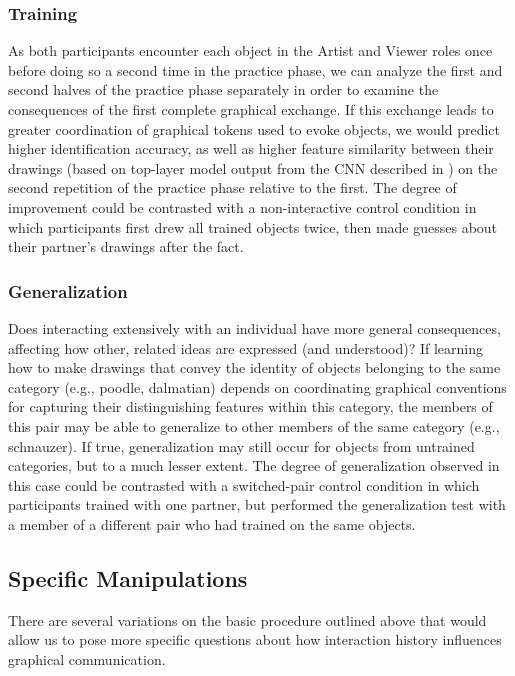 \documentclass[12pt]{article}
\begin{document}
\subsubsection{Training}

As both participants encounter each object in the Artist and Viewer roles once before doing so a second time in the practice phase, we can analyze the first and second halves of the practice phase separately in order to examine the consequences of the first complete graphical exchange. If this exchange leads to greater coordination of graphical tokens used to evoke objects, we would predict higher identification accuracy, as well as higher feature similarity between their drawings (based on top-layer model output from the CNN described in ) on the second repetition of the practice phase relative to the first. The degree of improvement could be contrasted with a non-interactive control condition in which participants first drew all trained objects twice, then made guesses about their partner's drawings after the fact. 

\subsubsection{Generalization}

Does interacting extensively with an individual have more general consequences, affecting how other, related ideas are expressed (and understood)? If learning how to make drawings that convey the identity of objects belonging to the same category (e.g., poodle, dalmatian) depends on coordinating graphical conventions for capturing their distinguishing features within this category, the members of this pair may be able to generalize to other members of the same category (e.g., schnauzer). If true, generalization may still occur for objects from untrained categories, but to a much lesser extent. The degree of generalization observed in this case could be contrasted with a switched-pair control condition in which participants trained with one partner, but performed the generalization test with a member of a different pair who had trained on the same objects. 

\subsection{Specific Manipulations}

There are several variations on the basic procedure outlined above that would allow us to pose more specific questions about how interaction history influences graphical communication.
\end{document}
